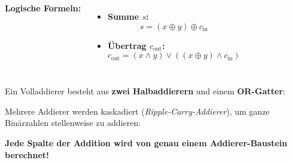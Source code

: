 \begin{frame}
\begin{columns}[c]
\centering
{}
\textbf{Logische Formeln:}
\vspace{2mm}
\begin{itemize}[<+->]
    \item \textbf{Summe $s$:}
    \[
        s = (x \oplus y) \oplus c_{\text{in}}
    \]
    \item \textbf{Übertrag $c_{\text{out}}$:}
    \[
        c_{\text{out}} = (x \wedge y) \vee ((x \oplus y) \wedge c_{\text{in}})
    \]
\end{itemize}
\end{columns}
\end{frame}

\begin{frame}
Ein Volladdierer besteht aus \textbf{zwei Halbaddierern} und einem \textbf{OR-Gatter}:
\vspace{3mm}
\begin{center}

\end{center}
\end{frame}

\begin{frame}
Mehrere Addierer werden kaskadiert (\textit{Ripple-Carry-Addierer}), um ganze Binärzahlen stellenweise zu addieren:
\vspace{2mm}
\begin{center}
\scalebox{0.7}{}
\end{center}
\begin{center}\color{FDUteal}\bfseries Jede Spalte der Addition wird von genau einem Addierer-Baustein berechnet!\end{center}
\end{frame}

